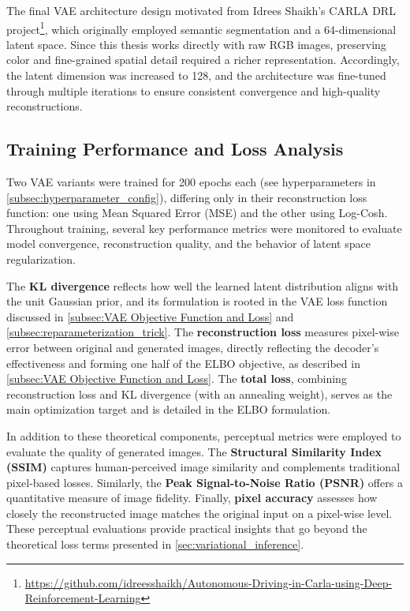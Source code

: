 The final VAE architecture design motivated from Idrees Shaikh’s CARLA DRL project\footnote{\url{https://github.com/idreesshaikh/Autonomous-Driving-in-Carla-using-Deep-Reinforcement-Learning}}, which originally employed semantic segmentation and a 64-dimensional latent space. Since this thesis works directly with raw RGB images, preserving color and fine-grained spatial detail required a richer representation. Accordingly, the latent dimension was increased to 128, and the architecture was fine-tuned through multiple iterations to ensure consistent convergence and high-quality reconstructions.

\clearpage



\subsection{Training Performance and Loss Analysis} \label{subsubsec:vae_training_loss}

Two VAE variants were trained for 200 epochs each (see hyperparameters in \cref{subsec:hyperparameter_config}), differing only in their reconstruction loss function: one using Mean Squared Error (MSE) and the other using Log-Cosh. Throughout training, several key performance metrics were monitored to evaluate model convergence, reconstruction quality, and the behavior of latent space regularization.

The \textbf{KL divergence} reflects how well the learned latent distribution aligns with the unit Gaussian prior, and its formulation is rooted in the VAE loss function discussed in \cref{subsec:VAE Objective Function and Loss} and \cref{subsec:reparameterization_trick}. The \textbf{reconstruction loss} measures pixel-wise error between original and generated images, directly reflecting the decoder's effectiveness and forming one half of the ELBO objective, as described in \cref{subsec:VAE Objective Function and Loss}. The \textbf{total loss}, combining reconstruction loss and KL divergence (with an annealing weight), serves as the main optimization target and is detailed in the ELBO formulation. 

In addition to these theoretical components, perceptual metrics were employed to evaluate the quality of generated images. The \textbf{Structural Similarity Index (SSIM)} captures human-perceived image similarity and complements traditional pixel-based losses. Similarly, the \textbf{Peak Signal-to-Noise Ratio (PSNR)} offers a quantitative measure of image fidelity. Finally, \textbf{pixel accuracy} assesses how closely the reconstructed image matches the original input on a pixel-wise level. These perceptual evaluations provide practical insights that go beyond the theoretical loss terms presented in \cref{sec:variational_inference}.

